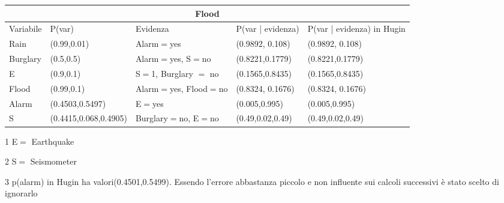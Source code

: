 \documentclass{report}
\begin{document}
\newpage
\begin{table}[hbt!]
\small
\hskip-1.0cm\begin{threeparttable}
\begin{tabular}{ |p{2cm}||p{3cm}|p{2cm}|p{3cm}|p{3cm}|  }
\hline
 \multicolumn{5}{|c|}{Flood} \\
 \hline
Variabile & P(var) & Evidenza & P(var | evidenza) & P(var | evidenza)  in Hugin\\
 \hline
Rain &(0.99,0.01) & Alarm$=$yes & (0.9892, 0.108) &(0.9892, 0.108)\\
\hline
Burglary & (0.5,0.5) & Alarm$=$yes, S$=$no & (0.8221,0.1779)& (0.8221,0.1779)\\
\hline
E & (0.9,0.1) & S$=$1, Burglary $=$ no & (0.1565,0.8435) & (0.1565,0.8435)\\
\hline
Flood & (0.99,0.1) & Alarm$=$yes, Flood$=$no & (0.8324, 0.1676) & (0.8324, 0.1676)\\
\hline
Alarm & (0.4503,0.5497) & E$=$yes& (0.005,0.995) & (0.005,0.995)\\
\hline
S & (0.4415,0.068,0.4905) & Burglary$=$no, E$=$no & (0.49,0.02,0.49) &(0.49,0.02,0.49)\\
\hline
\end{tabular}
\begin{tablenotes}
 	    \item[1] E$=$ Earthquake 
        \item[2] S$=$ Seismometer
        \item[3] p(alarm) in Hugin ha valori(0.4501,0.5499). Essendo l'errore abbastanza piccolo e non influente sui calcoli successivi è stato scelto di ignorarlo
 \end{tablenotes}
\end{threeparttable}
\end{table}
\end{document}
